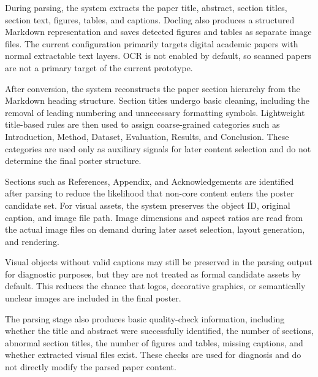 \documentclass[12pt,oneside]{report}
\begin{document}
\vspace{1em}

During parsing, the system extracts the paper title, abstract, section titles, section text, figures, tables, and captions. Docling also produces a structured Markdown representation and saves detected figures and tables as separate image files. The current configuration primarily targets digital academic papers with normal extractable text layers. OCR is not enabled by default, so scanned papers are not a primary target of the current prototype.

\vspace{1em}

After conversion, the system reconstructs the paper section hierarchy from the Markdown heading structure. Section titles undergo basic cleaning, including the removal of leading numbering and unnecessary formatting symbols. Lightweight title-based rules are then used to assign coarse-grained categories such as Introduction, Method, Dataset, Evaluation, Results, and Conclusion. These categories are used only as auxiliary signals for later content selection and do not determine the final poster structure.

\vspace{1em}

Sections such as References, Appendix, and Acknowledgements are identified after parsing to reduce the likelihood that non-core content enters the poster candidate set. For visual assets, the system preserves the object ID, original caption, and image file path. Image dimensions and aspect ratios are read from the actual image files on demand during later asset selection, layout generation, and rendering.

\vspace{1em}

Visual objects without valid captions may still be preserved in the parsing output for diagnostic purposes, but they are not treated as formal candidate assets by default. This reduces the chance that logos, decorative graphics, or semantically unclear images are included in the final poster.

\vspace{1em}

The parsing stage also produces basic quality-check information, including whether the title and abstract were successfully identified, the number of sections, abnormal section titles, the number of figures and tables, missing captions, and whether extracted visual files exist. These checks are used for diagnosis and do not directly modify the parsed paper content.
\end{document}
